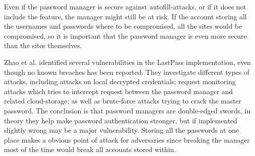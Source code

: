 \par Even if the password manager is secure against autofill-attacks, or if it does not include the feature, the manager might still be at risk. If the account storing all the usernames and passwords where to be compromised, all the sites would be compromised, so it is important that the password manager is even more secure than the sites themselves. 
\par Zhao et al. \cite{lastpass-security} identified several vulnerabilities in the LastPass implementation, even though no known breaches has been reported. They investigate different types of attacks, including attacks on local decrypted credentials; request monitoring attacks which tries to intercept request between the password manager and related cloud-storage; as well as brute-force attacks trying to crack the master password. The conclusion is that password managers are double-edged swords, in theory they help make password authentication stronger, but if implemented slightly wrong may be a major vulnerability. Storing all the passwords at one place makes a obvious point of attack for adversaries since breaking the manager most of the time would break all accounts stored within.





